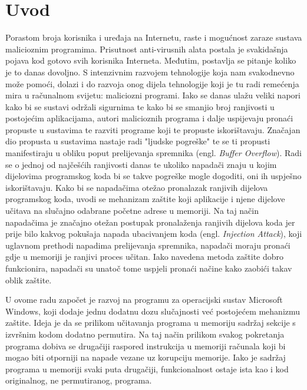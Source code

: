 \documentclass[times, utf8, diplomski, numeric]{fer}
\begin{document}
\chapter{Uvod}
Porastom broja korisnika i uređaja na Internetu, raste i mogućnost zaraze sustava malicioznim programima. Prisutnost anti-virusnih alata postala je svakidašnja pojava kod gotovo svih korisnika Interneta. Međutim, postavlja se pitanje koliko je to danas dovoljno. S intenzivnim razvojem tehnologije koja nam svakodnevno može pomoći, dolazi i do razvoja onog dijela tehnologije koji je tu radi remećenja mira u računalnom svijetu: maliciozni programi. Iako se danas ulažu veliki napori kako bi se sustavi održali sigurnima te kako bi se smanjio broj ranjivosti u postojećim aplikacijama, autori malicioznih programa i dalje uspijevaju pronaći propuste u sustavima te razviti programe koji te propuste iskorištavaju. Značajan dio propusta u sustavima nastaje radi "ljudske pogreške" te se ti propusti manifestiraju u obliku poput prelijevanja spremnika (engl. \emph{Buffer Overflow}). Radi se o jednoj od najčešćih ranjivosti danas te ukoliko napadači znaju u kojim dijelovima programskog koda bi se takve pogreške mogle dogoditi, oni ih uspješno iskorištavaju. Kako bi se napadačima otežao pronalazak ranjivih dijelova programskog koda, uvodi se mehanizam zaštite koji aplikacije i njene dijelove učitava na slučajno odabrane početne adrese u memoriji. Na taj način napadačima je značajno otežan postupak pronalaženja ranjivih dijelova koda jer prije bilo kakvog pokušaja napada ubacivanjem koda (engl. \emph{Injection Attack}), koji uglavnom prethodi napadima prelijevanja spremnika, napadači moraju pronaći gdje u memoriji je ranjivi proces učitan. Iako navedena metoda zaštite dobro funkcionira, napadači su unatoč tome uspjeli pronaći načine kako zaobići takav oblik zaštite.

U ovome radu započet je razvoj na programu za operacijski sustav Microsoft Windows, koji dodaje jednu dodatnu dozu slučajnosti već postojećem mehanizmu zaštite. Ideja je da se prilikom učitavanja programa u memoriju sadržaj sekcije s izvršnim kodom dodatno permutira. Na taj način prilikom svakog pokretanja programa dobiva se drugačiji raspored instrukcija u memoriji računala koji bi mogao biti otporniji na napade vezane uz korupciju memorije. Iako je sadržaj programa u memoriji svaki puta drugačiji, funkcionalnost ostaje ista kao i kod originalnog, ne permutiranog, programa.
\end{document}
